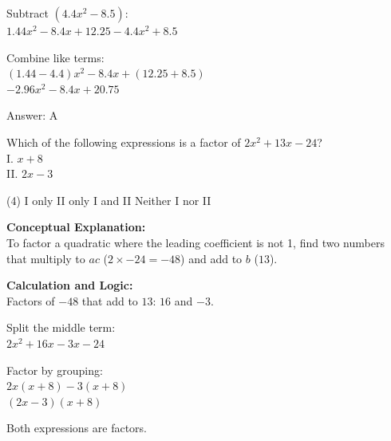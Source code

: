 \documentclass[11pt,paper=a4,answers]{exam}
\begin{document}
\begin{questions}
\begin{solution}
\vspace{10pt}

Subtract $(4.4x^2 - 8.5)$: \\
$1.44x^2 - 8.4x + 12.25 - 4.4x^2 + 8.5$

\vspace{10pt}

Combine like terms: \\
$(1.44 - 4.4)x^2 - 8.4x + (12.25 + 8.5)$ \\
$-2.96x^2 - 8.4x + 20.75$

\vspace{25pt}

Answer: \colorbox{yellow!100}{A}
\end{solution}

\vspace{40pt}

\question
Which of the following expressions is a factor of $2x^2 + 13x - 24$? \\
I. $x + 8$ \\
II. $2x - 3$
\begin{tasks}(4)
    \task I only
    \task II only
    \task I and II
    \task Neither I nor II
\end{tasks}

\begin{solution}
\textbf{Conceptual Explanation:} \\
To factor a quadratic where the leading coefficient is not 1, find two numbers that multiply to $ac$ ($2 \times -24 = -48$) and add to $b$ ($13$).

\vspace{20pt}

\textbf{Calculation and Logic:} \\
Factors of $-48$ that add to $13$: $16$ and $-3$.

\vspace{10pt}

Split the middle term: \\
$2x^2 + 16x - 3x - 24$

\vspace{10pt}

Factor by grouping: \\
$2x(x + 8) - 3(x + 8)$ \\
$(2x - 3)(x + 8)$

\vspace{10pt}

Both expressions are factors.


\end{solution}
\end{questions}
\end{document}
